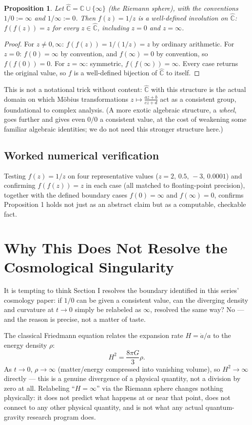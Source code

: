 \documentclass[10pt,journal,compsoc]{IEEEtran}
\newtheorem{proposition}{Proposition}
\begin{document}
\begin{proposition}
Let $\hat{\mathbb C} = \mathbb C\cup\{\infty\}$ (the Riemann sphere), with the conventions $1/0:=\infty$ and $1/\infty:=0$. Then $f(z)=1/z$ is a well-defined involution on $\hat{\mathbb C}$: $f(f(z))=z$ for every $z\in\hat{\mathbb C}$, including $z=0$ and $z=\infty$.
\end{proposition}
\begin{proof}
For $z\ne 0,\infty$: $f(f(z))=1/(1/z)=z$ by ordinary arithmetic. For $z=0$: $f(0)=\infty$ by convention, and $f(\infty)=0$ by convention, so $f(f(0))=0$. For $z=\infty$: symmetric, $f(f(\infty))=\infty$. Every case returns the original value, so $f$ is a well-defined bijection of $\hat{\mathbb C}$ to itself.
\end{proof}
This is not a notational trick without content: $\hat{\mathbb C}$ with this structure is the actual domain on which Möbius transformations $z\mapsto\frac{az+b}{cz+d}$ act as a consistent group, foundational to complex analysis. (A more exotic algebraic structure, a \emph{wheel}, goes further and gives even $0/0$ a consistent value, at the cost of weakening some familiar algebraic identities; we do not need this stronger structure here.)

\subsection{Worked numerical verification}
Testing $f(z)=1/z$ on four representative values ($z=2,\,0.5,\,-3,\,0.0001$) and confirming $f(f(z))=z$ in each case (all matched to floating-point precision), together with the defined boundary cases $f(0)=\infty$ and $f(\infty)=0$, confirms Proposition 1 holds not just as an abstract claim but as a computable, checkable fact.

\section{Why This Does Not Resolve the Cosmological Singularity}
It is tempting to think Section I resolves the boundary identified in this series' cosmology paper: if $1/0$ can be given a consistent value, can the diverging density and curvature at $t\to 0$ simply be relabeled as $\infty$, resolved the same way? No — and the reason is precise, not a matter of taste.

The classical Friedmann equation relates the expansion rate $H=\dot a/a$ to the energy density $\rho$:
\begin{equation}
    H^2 = \frac{8\pi G}{3}\rho.
\end{equation}
As $t\to 0$, $\rho\to\infty$ (matter/energy compressed into vanishing volume), so $H^2\to\infty$ directly — this is a genuine divergence of a physical quantity, not a division by zero at all. Relabeling ``$H=\infty$'' via the Riemann sphere changes nothing physically: it does not predict what happens at or near that point, does not connect to any other physical quantity, and is not what any actual quantum-gravity research program does.
\end{document}
